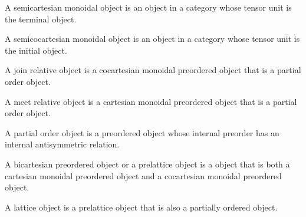\begin{definition}
    \label{definition-semicartesian-monoidal-preordered-object}
    A semicartesian monoidal object is an object in a category whose tensor unit is the terminal object.
\end{definition}

\begin{definition}
    \label{definition-semicocartesian-monoidal-preordered-object}
    A semicocartesian monoidal object is an object in a category whose tensor unit is the initial object.
\end{definition}

\begin{definition}
    \label{definition-join-relative-object}
    A join relative object is a cocartesian monoidal preordered object that is a partial order object.
\end{definition}

\begin{definition}
    \label{definition-meet-relative-object}
    A meet relative object is a cartesian monoidal preordered object that is a partial order object.
\end{definition}

\begin{definition}
    \label{definition-partial-order-object}
    A partial order object is a preordered object whose internal preorder has an internal antisymmetric relation.
\end{definition}

\begin{definition}
    \label{definition-bicartesian-preordered-object}
    A bicartesian preordered object or a prelattice object is a object that is both a cartesian monoidal preordered object and a cocartesian monoidal preordered object.
\end{definition}

\begin{definition}
    \label{definition-lattice-object}
    A lattice object is a prelattice object that is also a partially ordered object.
\end{definition}


